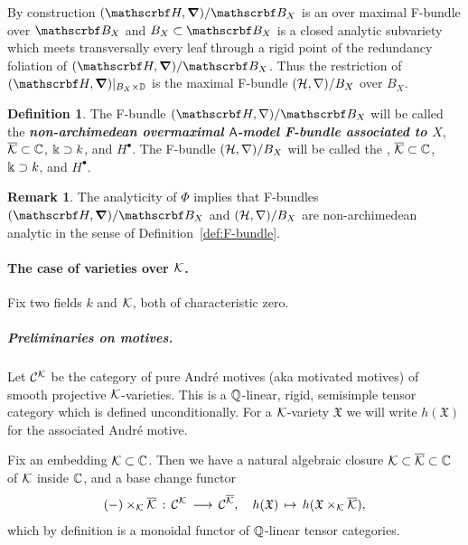 \documentclass[twoside,leqno]{article}
\numberwithin{equation}{section}
\theoremstyle{plain}
\theoremstyle{definition}
\newtheorem{definition}[equation]{Definition}
\newtheorem{remark}[equation]{Remark}
\begin{document}
By construction $(\omH,\bnabla)/\omB_{X}$ is an over maximal F-bundle over $\omB_{X}$ and 
$B_{X} \subset \omB_{X}$ is a closed analytic subvariety which meets transversally every leaf through a rigid point of the redundancy foliation of $(\omH,\bnabla)/\omB_{X}$. Thus  the restriction of $(\omH,\bnabla)|_{B_{X}\times \bbD}$ is the maximal F-bundle $(\mathcal H,\nabla)/B_{X}$ over $B_{X}$.

\begin{definition} \label{def:nonarchF}
The F-bundle $(\omH,\nabla)/\omB_{X}$ will be called the \emph{\bfseries
non-archimedean overmaximal $\mathsf{A}$-model F-bundle associated
to $X$}, $\overline{\mathcal K} \subset \mathbb C$, $\Bbbk \supset k$, and $H^{\bullet}$.  The F-bundle $(\mathcal H,\nabla)/B_{X}$
will be called the , $\overline{\mathcal K} \subset \mathbb C$, 
$\Bbbk \supset k$, and $H^{\bullet}$.
\end{definition}

\begin{remark} \label{rem:formal_in_u}
The analyticity of $\Phi$ implies that F-bundles $(\omH,\bnabla)/\omB_{X}$ and $(\mathcal H,\nabla)/B_{X}$ are non-archimedean analytic in the sense of Definition~\ref{def:F-bundle}.
\end{remark}

\paragraph{The case of varieties over $\mathcal K$.}  \label{par:casekay}
Fix two fields $k$ and $\mathcal K$, both of characteristic zero.

\subparagraph{Preliminaries on motives.} \label{subpar:motivess}
Let $\mathcal{C}^{\mathcal K}$ be the category of pure Andr\'{e} motives (aka
motivated motives)
\cite{Andre_Pour_une_theorie_inconditionnelle_des_motifs} of smooth
projective $\mathcal K$-varieties. This is a $\mathbb Q$-linear, rigid,
semisimple tensor category which is defined unconditionally.  For a
$\mathcal K$-variety $\mathfrak{X}$ we will write 
$h(\mathfrak{X})$ for the associated Andr\'{e} motive.


Fix an embedding $\mathcal K \subset  \mathbb C$. Then we
have a natural algebraic closure $\mathcal K \subset \overline{\mathcal K} \subset \mathbb C$
of $\mathcal K$ inside $\mathbb C$, and a base change functor
\[
(-)\times_{\mathcal K} \overline{\mathcal K} \, : \, \mathcal{C}^{\mathcal K} \, \longrightarrow \, \mathcal{C}^{\overline{\mathcal K}},
\quad h(\mathfrak{X}) \, \mapsto \, h(\mathfrak{X}\times_{\mathcal K} \overline{\mathcal K}),
\]
which by definition is a monoidal functor of $\mathbb Q$-linear tensor
categories.
\end{document}
